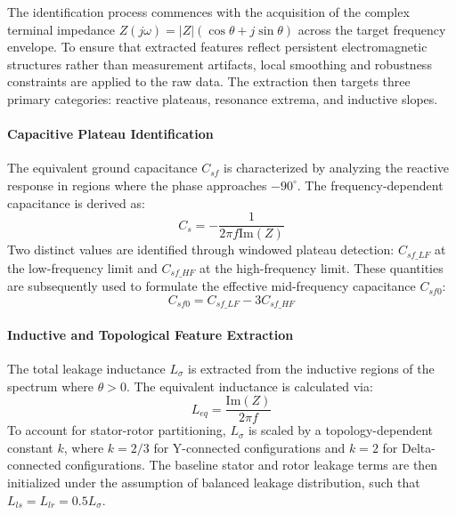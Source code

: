 \documentclass[12pt,a4paper]{article}
\begin{document}
The identification process commences with the acquisition of the complex terminal impedance $Z(j\omega) = |Z|(\cos\theta + j \sin\theta)$ across the target frequency envelope. To ensure that extracted features reflect persistent electromagnetic structures rather than measurement artifacts, local smoothing and robustness constraints are applied to the raw data. The extraction then targets three primary categories: reactive plateaus, resonance extrema, and inductive slopes.

\paragraph{Capacitive Plateau Identification}
The equivalent ground capacitance $C_{sf}$ is characterized by analyzing the reactive response in regions where the phase approaches $-90^\circ$\cite{ref1,ref7,ref29,ref32,ref36}. The frequency-dependent capacitance is derived as:
\begin{equation}
C_s = -\frac{1}{2\pi f \text{Im}(Z)}
\end{equation}
Two distinct values are identified through windowed plateau detection: $C_{sf\_LF}$ at the low-frequency limit and $C_{sf\_HF}$ at the high-frequency limit. These quantities are subsequently used to formulate the effective mid-frequency capacitance $C_{sf0}$:
\begin{equation}
C_{sf0} = C_{sf\_LF} - 3C_{sf\_HF}
\end{equation}

\paragraph{Inductive and Topological Feature Extraction}
The total leakage inductance $L_\sigma$ is extracted from the inductive regions of the spectrum where $\theta > 0$. The equivalent inductance is calculated via:
\begin{equation}
L_{eq} = \frac{\text{Im}(Z)}{2\pi f}
\end{equation}
To account for stator-rotor partitioning, $L_\sigma$ is scaled by a topology-dependent constant $k$, where $k = 2/3$ for Y-connected configurations and $k = 2$ for Delta-connected configurations. The baseline stator and rotor leakage terms are then initialized under the assumption of balanced leakage distribution, such that $L_{ls} = L_{lr} = 0.5L_\sigma$.
\end{document}
